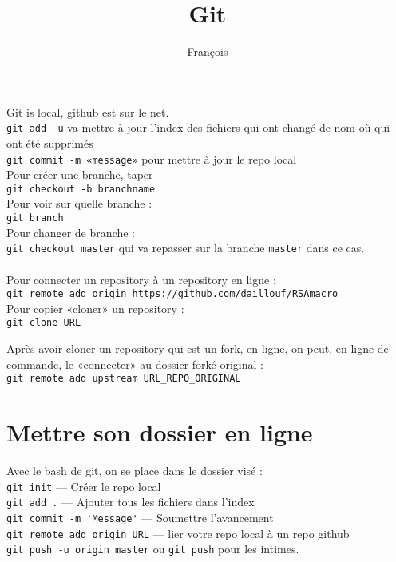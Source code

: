 \documentclass{article}
\begin{document}
\title{Git}

\author{François}
\maketitle

Git is local, github est sur le net.\\
\verb!git add -u! va mettre à jour l'index des fichiers qui ont changé de nom où qui ont été supprimés \\
\verb!git commit -m «message»! pour mettre à jour le repo local \\
Pour créer une branche, taper \\
\verb!git checkout -b branchname!\\
Pour voir sur quelle branche :\\
\verb!git branch!\\
Pour changer de branche :\\
\verb!git checkout master! qui va repasser sur la branche \verb!master! dans ce cas.\\
\\
Pour connecter un repository à un repository en ligne :\\
\verb!git remote add origin https://github.com/daillouf/RSAmacro!\\

Pour copier «cloner» un repository :\\
\verb!git clone URL!

Après avoir cloner un repository qui est un fork, en ligne, on peut, en ligne de commande, le «connecter» au dossier forké original : \\
\verb!git remote add upstream URL_REPO_ORIGINAL!\\

\section{Mettre son dossier en ligne}
Avec le bash de git, on se place dans le dossier visé :\\
\verb!git init! — Créer le repo local\\
\verb!git add .! — Ajouter tous les fichiers dans l'index\\
\verb!git commit -m 'Message'! —  Soumettre l'avancement\\
\verb!git remote add origin URL! —  lier votre repo local à un repo github\\
\verb!git push -u origin master! ou \verb!git push! pour les intimes.\\
 
\end{document}
